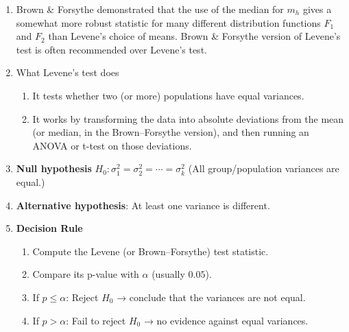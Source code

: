 \begin{enumerate}
    \item Brown \& Forsythe demonstrated that the use of the median for $m _h$ gives a somewhat more robust statistic for many different distribution functions $F_1$ and $F_2$ than Levene’s choice of means.
    Brown \& Forsythe version of Levene’s test is often recommended over Levene’s test.
    \hfill \cite{statistics/book/Statistics-for-Data-Scientists/Maurits-Kaptein}

    \item What Levene’s test does
    \hfill \cite{common/online/chatgpt}
    \begin{enumerate}
        \item It tests whether two (or more) populations have equal variances.
        \hfill \cite{common/online/chatgpt}

        \item It works by transforming the data into absolute deviations from the mean (or median, in the Brown–Forsythe version), and then running an ANOVA or t-test on those deviations.
        \hfill \cite{common/online/chatgpt}
    \end{enumerate}

    \item \textbf{Null hypothesis} $H_0: \sigma_1^2 = \sigma_2^2 = \cdots = \sigma_k^2$
    (All group/population variances are equal.)
    \hfill \cite{common/online/chatgpt}

    \item \textbf{Alternative hypothesis}: At least one variance is different.
    \hfill \cite{common/online/chatgpt}

    \item \textbf{Decision Rule}
    \hfill \cite{common/online/chatgpt}
    \begin{enumerate}
        \item Compute the Levene (or Brown–Forsythe) test statistic.
        \hfill \cite{common/online/chatgpt}

        \item Compare its p-value with $\alpha$ (usually $0.05$).
        \hfill \cite{common/online/chatgpt}

        \item If $p\leq\alpha$: Reject $H_0$ → conclude that the variances are not equal.
        \hfill \cite{common/online/chatgpt}

        \item If $p>\alpha$: Fail to reject $H_0$ → no evidence against equal variances.
        \hfill \cite{common/online/chatgpt}
    \end{enumerate}
\end{enumerate}





